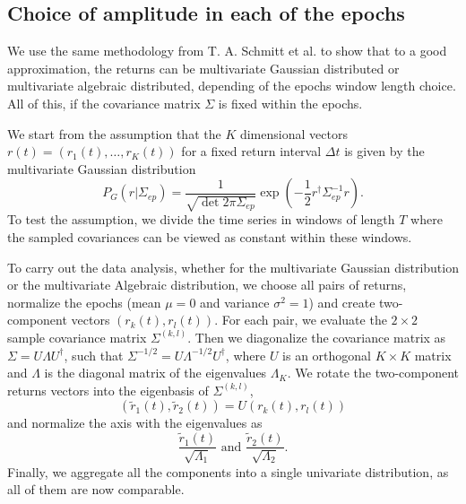 \subsection{Choice of amplitude in each of the epochs}\label{subsec:epochs}

We use the same methodology from T. A. Schmitt et al.
\cite{non_stationarity_fin_guhr} to show that to a good approximation, the
returns can be multivariate Gaussian distributed or multivariate algebraic
distributed, depending of the epochs window length choice. All of this, if the
covariance matrix $\Sigma$ is fixed within the epochs.

We start from the assumption that the $K$ dimensional vectors
$r \left( t \right) = \left( r_{1} \left( t \right), \ldots, r_{K} \left( t \right) \right)$
for a fixed return interval $\Delta t$ is given by the multivariate Gaussian
distribution
\begin{equation}\label{eq:gaussian_distribution}
    P_{G} \left( r| \Sigma_{ep} \right) =
    \frac{1}{\sqrt{\det 2 \pi \Sigma_{ep} }}
    \exp \left( - \frac{1}{2} r^{\dagger} \Sigma_{ep}^{-1} r \right).
\end{equation}
To test the assumption, we divide the time series in windows of length $T$ where
the sampled covariances can be viewed as constant within these windows.

To carry out the data analysis, whether for the multivariate Gaussian
distribution or the multivariate Algebraic distribution, we choose all pairs of
returns, normalize the epochs (mean $\mu = 0$ and variance $\sigma^{2} = 1$) and
create two-component vectors
$\left( r_{k} \left( t \right), r_{l} \left( t \right) \right)$. For each pair,
we evaluate the $2 \times 2$ sample covariance matrix
$\Sigma^{\left(k, l \right)}$. Then we diagonalize the covariance matrix as
$\Sigma = U \Lambda U^{\dagger}$, such that
$\Sigma^{-1/2} = U \Lambda^{-1/2} U^{\dagger}$, where $U$ is an orthogonal
$K \times K$  matrix and $\Lambda$ is the diagonal matrix of the eigenvalues
$\Lambda_{K}$. We rotate the two-component returns vectors into the eigenbasis
of $\Sigma^{\left(k, l \right)}$,
\begin{equation}
    \left(\tilde{r}_{1} \left(t \right), \tilde{r}_{2} \left(t \right) \right)
    = U \left(r_{k} \left(t \right), r_{l} \left(t \right) \right)
\end{equation}
and normalize the axis with the eigenvalues as
\begin{equation}
    \frac{\tilde{r}_{1} \left(t \right)}{\sqrt{\Lambda_{1}}} \text{ and }
    \frac{\tilde{r}_{2} \left(t \right)}{\sqrt{\Lambda_{2}}}.
\end{equation}
Finally, we aggregate all the components into a single univariate distribution,
as all of them are now comparable.

